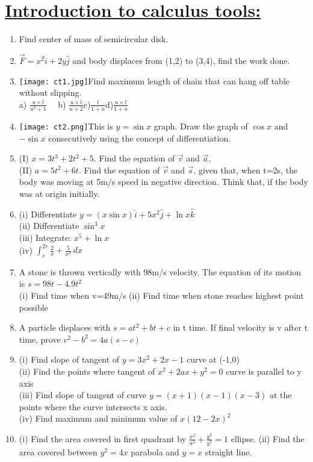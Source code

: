 \documentclass[12pt]{article}
\begin{document}
\section*{\underline{Introduction to calculus tools:}}
\Large{\begin{enumerate}
\item Find center of mass of semicircular disk.
\item \(\vec{F}=x^2 \hat{i}+2y\hat{j}\) and body displaces from (1,2) to (3,4), find the work done.
\item \texttt{[image: ct1.jpg]}\quad Find maximum length of chain that can hang off table without slipping.\\a) \(\frac{u\times l}{u^2+1}\quad\) b) \( \frac{u\times l}{u+2} \)\quad c)\(\frac{l}{1+u}\)\quad d)\(\frac{u\times l}{1+u}\)
\item \texttt{[image: ct2.png]}\quad This is \( y=\sin x\) graph. Draw the graph of \(\cos x\) and \( -\sin x\) consecutively using the concept of differentiation.
\item  (I) \( x=3t^3 +2t^2 +5\). Find the equation of \(\vec{v}\) and \(\vec{a}\). \\(II) \(a=5t^2 +6t\). Find the equation of \(\vec{v}\) and \(\vec{s}\), given that, when t=2s, the body was moving at 5m/s speed in negative direction. Think that, if the body was at origin initially. 
\item (i) Differentiate \(y=(x\sin x)\hat{i}+5x^2 \hat{j}+\ln{x} \hat{k}\) \\(ii) Differentiate \(\sin ^3x\)\\ (iii) Integrate: \(x^5 +\ln x\)\\ (iv) \(\int_{e}^{2e} \frac{2}{x} + \frac{5}{x^3} \,dx\)
\item A stone is thrown vertically with 98m/s velocity. The equation of its motion is \(s=98t-4.9t^2\) \\(i) Find time when v=49m/s (ii) Find time when stone reaches highest point possible
\item  A particle displaces with \(s=at^2 +bt+c\) in t time. If final velocity is v after t time, prove \(v^2 -b^2 = 4a(s-c)\) 
\item  (i) Find slope of tangent of \(y=3x^2 + 2x-1\) curve at (-1,0)\\ (ii) Find the points where tangent of \(x^2 +2ax +y^2 =0 \) curve is parallel to y axis \\(iii) Find slope of tangent of curve \( y=(x+1)(x-1)(x-3)\) at the points where the curve intersects x axis.\\(iv) Find maximum and minimum value of \(x(12-2x)^2\)
\item (i) Find the area covered in first quadrant by \( \frac{x^2}{a^2} +\frac{y^2}{b^2} =1\) ellipse. (ii) Find the area covered between \( y^2=4x\) parabola and \(y=x\) straight line. 

\end{enumerate}
 }
\end{document}
